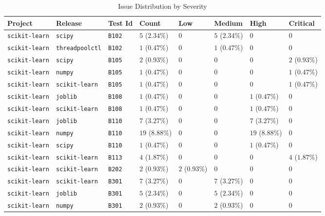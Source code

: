 \begin{table}
\caption{Issue Distribution by Severity}
\label{tab:issue-distribution}
\begin{tabular}{llllllll}
\toprule
Project & Release & Test Id & Count & Low & Medium & High & Critical \\
\midrule
\texttt{scikit-learn} & \texttt{scipy} & \texttt{B102} & $5$ ($2.34\%$) & $0$ & $5$ ($2.34\%$) & $0$ & $0$ \\
\texttt{scikit-learn} & \texttt{threadpoolctl} & \texttt{B102} & $1$ ($0.47\%$) & $0$ & $1$ ($0.47\%$) & $0$ & $0$ \\
\texttt{scikit-learn} & \texttt{scipy} & \texttt{B105} & $2$ ($0.93\%$) & $0$ & $0$ & $0$ & $2$ ($0.93\%$) \\
\texttt{scikit-learn} & \texttt{numpy} & \texttt{B105} & $1$ ($0.47\%$) & $0$ & $0$ & $0$ & $1$ ($0.47\%$) \\
\texttt{scikit-learn} & \texttt{scikit-learn} & \texttt{B105} & $1$ ($0.47\%$) & $0$ & $0$ & $0$ & $1$ ($0.47\%$) \\
\texttt{scikit-learn} & \texttt{joblib} & \texttt{B108} & $1$ ($0.47\%$) & $0$ & $0$ & $1$ ($0.47\%$) & $0$ \\
\texttt{scikit-learn} & \texttt{scikit-learn} & \texttt{B108} & $1$ ($0.47\%$) & $0$ & $0$ & $1$ ($0.47\%$) & $0$ \\
\texttt{scikit-learn} & \texttt{joblib} & \texttt{B110} & $7$ ($3.27\%$) & $0$ & $0$ & $7$ ($3.27\%$) & $0$ \\
\texttt{scikit-learn} & \texttt{numpy} & \texttt{B110} & $19$ ($8.88\%$) & $0$ & $0$ & $19$ ($8.88\%$) & $0$ \\
\texttt{scikit-learn} & \texttt{scipy} & \texttt{B110} & $1$ ($0.47\%$) & $0$ & $0$ & $1$ ($0.47\%$) & $0$ \\
\texttt{scikit-learn} & \texttt{scikit-learn} & \texttt{B113} & $4$ ($1.87\%$) & $0$ & $0$ & $0$ & $4$ ($1.87\%$) \\
\texttt{scikit-learn} & \texttt{scikit-learn} & \texttt{B202} & $2$ ($0.93\%$) & $2$ ($0.93\%$) & $0$ & $0$ & $0$ \\
\texttt{scikit-learn} & \texttt{scikit-learn} & \texttt{B301} & $7$ ($3.27\%$) & $0$ & $7$ ($3.27\%$) & $0$ & $0$ \\
\texttt{scikit-learn} & \texttt{joblib} & \texttt{B301} & $5$ ($2.34\%$) & $0$ & $5$ ($2.34\%$) & $0$ & $0$ \\
\texttt{scikit-learn} & \texttt{numpy} & \texttt{B301} & $2$ ($0.93\%$) & $0$ & $2$ ($0.93\%$) & $0$ & $0$ \\

\end{tabular}
\end{table}
